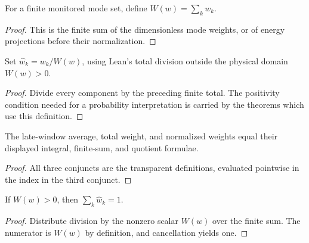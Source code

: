 \begin{definition}
\label{def:thermal:total-weight}
For a finite monitored mode set, define $W(w)=\sum_k w_k$.
\end{definition}
\begin{proof}

\leanok
This is the finite sum of the dimensionless mode weights, or of energy
projections before their normalization.
\end{proof}

\begin{definition}
\label{def:thermal:normalized-weights}
Set $\widehat w_k=w_k/W(w)$, using Lean's total division outside the physical
domain $W(w)>0$.
\end{definition}
\begin{proof}

\leanok
Divide every component by the preceding finite total.  The positivity
condition needed for a probability interpretation is carried by the theorems
which use this definition.
\end{proof}

\begin{theorem}
\label{thm:thermal:window-weights-spec}
The late-window average, total weight, and normalized weights equal their
displayed integral, finite-sum, and quotient formulae.
\end{theorem}
\begin{proof}

\leanok
All three conjuncts are the transparent definitions, evaluated pointwise in
the index in the third conjunct.
\end{proof}

\begin{theorem}
\label{thm:thermal:sum-normalized-weights}
If $W(w)>0$, then $\sum_k\widehat w_k=1$.
\end{theorem}
\begin{proof}

\leanok
Distribute division by the nonzero scalar $W(w)$ over the finite sum.  The
numerator is $W(w)$ by definition, and cancellation yields one.
\end{proof}

